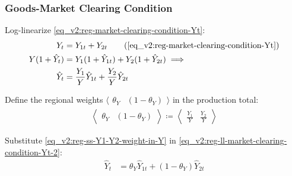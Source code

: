 \documentclass[../thesis.tex]{subfiles}
\begin{document}



\subsubsection*{Goods-Market Clearing Condition}

Log-linearize \ref{eq_v2:reg-market-clearing-condition-Yt}:
\begin{alignat}{2}
	Y_{t} &= Y_{1 t} + Y_{2 t} \tag{\ref{eq_v2:reg-market-clearing-condition-Yt}} \\
	Y (1 +\hat{Y}_{t}) &= Y_{1} (1 +\hat{Y}_{1t}) + Y_{2} (1 +\hat{Y}_{2t}) \implies \nonumber \\
	\hat{Y}_{t} &= \frac{Y_{1}}{Y} \hat{Y}_{1t} + \frac{Y_{2}}{Y} \hat{Y}_{2t} \label{eq_v2:reg-ll-market-clearing-condition-Yt-2}
\end{alignat}


Define the regional weights $\langle \begin{matrix} \theta_{Y} & (1-\theta_{Y}) \end{matrix} \rangle$ in the production total:
\begin{align}
	\left\langle \begin{matrix} \theta_{Y} & (1-\theta_{Y}) \end{matrix} \right\rangle \coloneq \left\langle \begin{matrix} \frac{Y_{1}}{Y} & \frac{Y_{2}}{Y} \end{matrix} \right\rangle \label{eq_v2:reg-ss-Y1-Y2-weight-in-Y}
\end{align}


Substitute \ref{eq_v2:reg-ss-Y1-Y2-weight-in-Y} in \ref{eq_v2:reg-ll-market-clearing-condition-Yt-2}:
\begin{align}
	\hat{Y}_{t} &= \theta_{Y} \hat{Y}_{1t} + (1-\theta_{Y}) \hat{Y}_{2t} \label{eq_v2:reg-ll-market-clearing-condition-Yt-3}
\end{align}

\end{document}
